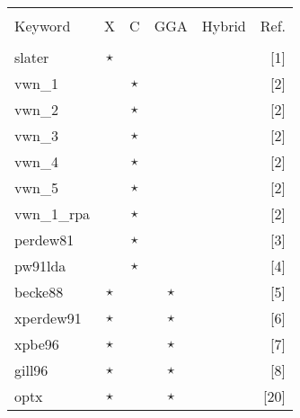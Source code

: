 %
\twocolumn
\begin{table}[htp]

\begin{tabular}{|l|cccc|r|}
\hline
           &          &             &        &         &         \\
Keyword    & X & C & GGA    &  Hybrid & Ref.\\
           &          &             &        &         &         \\
\hline
 slater     & $\star$    &            &         &         &[1]\\
\hline                                                  
vwn\_1     &          &   $\star$     &         &        &[2]     \\
vwn\_2     &          &   $\star$     &         &        &[2]    \\
vwn\_3     &          &   $\star$     &         &        &[2]     \\
vwn\_4     &          &   $\star$     &         &        &[2]     \\
vwn\_5     &          &   $\star$     &         &        &[2]     \\
vwn\_1\_rpa&          &   $\star$     &         &        &[2]     \\
perdew81   &          &   $\star$     &         &        &[3]     \\
pw91lda    &          &   $\star$     &         &        &[4]\\
\hline                                                  
becke88    & $\star$    &             &  $\star$  &        &[5]\\
xperdew91  & $\star$    &             &  $\star$  &        &[6]\\
xpbe96     & $\star$    &             &  $\star$  &        &[7]\\
gill96     & $\star$    &             &  $\star$  &        &[8]\\
optx       & $\star$    &             &  $\star$  &        &[20]\\

\end{tabular}
\end{table}
